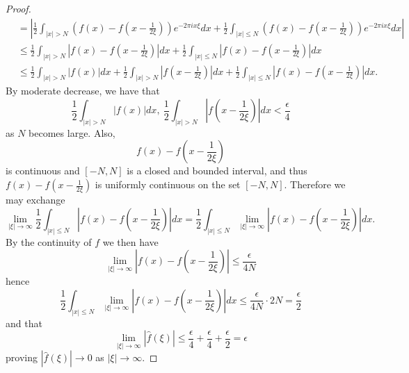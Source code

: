 \documentclass{article}
\begin{document}
\begin{proof}
\begin{align*}
    &= \left|\frac{1}{2} \int_{|x| > N} \left(f(x) - f \left(x - \frac{1}{2 \xi} \right) \right)e^{-2 \pi i x \xi} dx + \frac{1}{2} \int_{|x| \leq N} \left(f(x) - f \left(x - \frac{1}{2 \xi} \right) \right)e^{-2 \pi i x \xi} dx \right| \\
    &\leq \frac{1}{2}\int_{|x| > N}\left|f(x) - f \left(x - \frac{1}{2 \xi} \right)\right|dx + \frac{1}{2} \int_{|x|\leq N} \left|f(x) - f\left(x - \frac{1}{2 \xi} \right) \right| dx \\
    &\leq \frac{1}{2}\int_{|x| > N}\left|f(x)\right|dx+ \frac{1}{2}\int_{|x| > N}\left| f \left(x - \frac{1}{2 \xi} \right)\right|dx + \frac{1}{2} \int_{|x|\leq N} \left|f(x) - f\left(x - \frac{1}{2 \xi} \right) \right| dx. 
   \end{align*}
   By moderate decrease, we have that 
   \[
     \frac{1}{2}\int_{|x| > N}\left|f(x)\right|dx, \  \frac{1}{2}\int_{|x| > N}\left| f \left(x - \frac{1}{2 \xi} \right)\right|dx < \frac{\epsilon}{4}
   \]
   as $N$ becomes large. Also, 
   \[
   f(x) - f \left(x - \frac{1}{2 \xi} \right) 
   \]
   is continuous and $[-N, N]$ is a closed and bounded interval, and thus $f(x) - f \left(x - \frac{1}{2 \xi} \right)$ is uniformly continuous on the set $[-N, N]$. Therefore we may exchange
   \[
   \lim\limits_{|\xi| \to \infty}\frac{1}{2} \int_{|x|\leq N} \left|f(x) - f\left(x - \frac{1}{2 \xi} \right) \right| dx = \frac{1}{2} \int_{|x|\leq N}\lim\limits_{|\xi| \to \infty} \left|f(x) - f\left(x - \frac{1}{2 \xi} \right) \right| dx. 
   \]
   By the continuity of $f$ we then have 
   \[
   \lim\limits_{|\xi| \to \infty}\left|f(x) - f\left(x - \frac{1}{2 \xi}\right)\right| \leq \frac{\epsilon}{4N} 
   \]
   hence
   \[
    \frac{1}{2} \int_{|x|\leq N}\lim\limits_{|\xi| \to \infty} \left|f(x) - f\left(x - \frac{1}{2 \xi} \right) \right| dx \leq \frac{\epsilon}{4N} \cdot 2N = \frac{\epsilon}{2}
   \]
   and that \[
   \lim\limits_{|\xi| \to \infty} |\hat{f}(\xi)| \leq \frac{\epsilon}{4} + \frac{\epsilon}{4} + \frac{\epsilon}{2} = \epsilon
   \]
   proving $|\hat{f}(\xi)| \to 0$ as $|\xi| \to \infty$. 
\end{proof}
\end{document}

